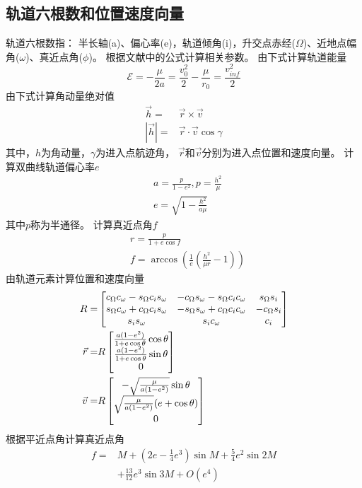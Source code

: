 \subsection{轨道六根数和位置速度向量} \label{secFormElement}
轨道六根数指：
半长轴(a)、偏心率(e)，轨道倾角(i)，升交点赤经($\Omega$)、近地点幅角($\omega$)、真近点角($\phi$)。
根据文献\cite{mruiter2012}中的公式计算相关参数。
由下式计算轨道能量
\begin{equation*}
    \mathcal{E}=-\frac{\mu}{2a}=\frac{v_0^2}{2}-\frac{\mu}{r_0} = \frac{v_{inf}^2}{2}
\end{equation*}
由下式计算角动量绝对值
\begin{align*}
    \vec{h} =& \vec{r}\times\vec{v} \\
    |\vec{h}| =& \vec{r}\cdot\vec{v}\cos\gamma
\end{align*}
其中，$h$为角动量，$\gamma$为进入点航迹角，
$\vec{r}$和$\vec{v}$分别为进入点位置和速度向量。
计算双曲线轨道偏心率$e$
\begin{align*}
    &a=\frac{p}{1-e^2},p=\frac{h^2}{\mu} \\
    &e=\sqrt{1-\frac{h^2}{a\mu}}
\end{align*}
其中$p$称为半通径。
计算真近点角$f$
\begin{align*}
    &r=\frac{p}{1+e\cos f} \\
    &f=\arccos(\frac{1}{e}(\frac{h^2}{\mu r}-1))
\end{align*}
由轨道元素计算位置和速度向量
\begin{align}
    R =& \left[\begin{matrix}
        c_\Omega c_\omega-s_\Omega c_i s_\omega & -c_\Omega s_\omega-s_\Omega c_i c_\omega & s_\Omega s_i \\
        s_\Omega c_\omega+c_\Omega c_i s_\omega & -s_\Omega s_\omega+c_\Omega c_i c_\omega & -c_\Omega s_i \\
        s_i s_\omega & s_i c_\omega & c_i
    \end{matrix}\right] \notag\\
    \vec{r} =& R\left[\begin{matrix}
        \frac{a(1-e^2)}{1+e\cos\theta}\cos\theta \\ \frac{a(1-e^2)}{1+e\cos\theta}\sin\theta \\ 0
    \end{matrix}\right] \notag\\
    \vec{v} =& R\left[\begin{matrix}
        -\sqrt{\frac{\mu}{a(1-e^2)}}\sin\theta \\ \sqrt{\frac{\mu}{a(1-e^2)}}(e+\cos\theta) \\ 0
    \end{matrix}\right] \label{eqFormEle2RV}
\end{align}
根据平近点角计算真近点角\cite{msmart1977}
\begin{align*}
    f =& M+\left(2e-{\frac {1}{4}}e^{3}\right)\sin {M}
    + {\frac {5}{4}}e^{2}\sin {2M} \\
    &+ {\frac {13}{12}}e^{3}\sin {3M}+O(e^{4})
\end{align*}

